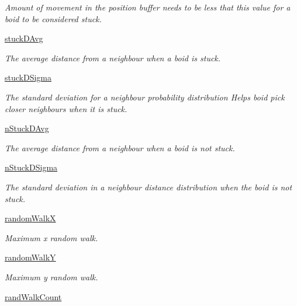 \begin{DoxyCompactItemize}
\begin{DoxyCompactList}\small\item\em Amount of movement in the position buffer needs to be less that this value for a boid to be considered stuck. \end{DoxyCompactList}\item 
\hyperlink{classboid_1_1Boid_a663164af1a20323f49e002d7576914f7}{stuck\-D\-Avg}
\begin{DoxyCompactList}\small\item\em The average distance from a neighbour when a boid is stuck. \end{DoxyCompactList}\item 
\hyperlink{classboid_1_1Boid_a03960faefd59c4a651442eb373aa5c15}{stuck\-D\-Sigma}
\begin{DoxyCompactList}\small\item\em The standard deviation for a neighbour probability distribution Helps boid pick closer neighbours when it is stuck. \end{DoxyCompactList}\item 
\hyperlink{classboid_1_1Boid_acdfca1dc9b177a512502c6af681bfa9e}{n\-Stuck\-D\-Avg}
\begin{DoxyCompactList}\small\item\em The average distance from a neighbour when a boid is not stuck. \end{DoxyCompactList}\item 
\hyperlink{classboid_1_1Boid_add42a1be4f79d1ae8990065fa7e5d4de}{n\-Stuck\-D\-Sigma}
\begin{DoxyCompactList}\small\item\em The standard deviation in a neighbour distance distribution when the boid is not stuck. \end{DoxyCompactList}\item 
\hyperlink{classboid_1_1Boid_a996d92e215eb56d98a811c86c7118637}{random\-Walk\-X}
\begin{DoxyCompactList}\small\item\em Maximum x random walk. \end{DoxyCompactList}\item 
\hyperlink{classboid_1_1Boid_a1bf0149b7eadf9e6a0f08c93d95bac73}{random\-Walk\-Y}
\begin{DoxyCompactList}\small\item\em Maximum y random walk. \end{DoxyCompactList}\item 
\hyperlink{classboid_1_1Boid_af0bd96c51b17bc6c3f6fec2891b58a3d}{rand\-Walk\-Count}

\end{DoxyCompactItemize}
